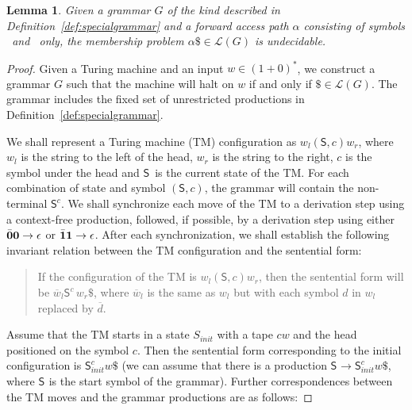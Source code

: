 \documentclass[9pt,nonatbib]{sigplanconf}
\newtheorem{lemma}[theorem]{Lemma}
\begin{document}
\newcommand{\state}{\ensuremath{\mathsf{S}}}
\newcommand{\nont}[2]{\ensuremath{\mathsf{S}_{#1}^{#2}}}
\begin{lemma}\label{lemma:grammar-undecidable}
Given a grammar    $G$    of   the    kind    described    in
Definition~\ref{def:specialgrammar}  and a forward access path $\alpha$
consisting  of symbols \acar\  and \acdr\  only, the membership problem
$\alpha\$ \in \mathscr{L}(G)$ is undecidable.
\end{lemma} 

\begin{proof}
Given a Turing machine and  an input $w\in (1+0)^*$, we
construct a grammar $G$ such that the machine will halt
on    $w$    if    and   only    if    $\$    \in
\mathscr{L}(G)$. The grammar includes  the fixed set of
unrestricted               productions               in
Definition~\ref{def:specialgrammar}.

We shall represent a Turing machine (TM) configuration 
as $w_l(\state,c)w_r$, where $w_l$ is the string to the
left of the head, $w_r$ is the string to the right, $c$
is the symbol under the head and \state\ is the current
state of  the TM.   For each combination  of state
and symbol  $(\state,c)$, the grammar will  contain the
non-terminal \nont{}{c}. We shall synchronize each move
of the TM to  a derivation  step using  a context-free production, followed, if possible, by a derivation
step using either  $\bar{\mathbf{0}}\mathbf{0} \rightarrow \epsilon$ or
$\bar{\mathbf{1}}\mathbf{1}   \rightarrow    \epsilon$.    After   each
synchronization,  we  shall   establish  the  following
invariant  relation between  the TM  configuration
and the sentential form:

\begin{quote}
  If    the   configuration    of   the    TM   is
  $w_l(\state,c)w_r$, then the  sentential form will be
  $\overline{w}_l\nont{}{c}\,w_r\$ $,                where
  $\overline{w}_l$ is  the same as $w_l$  but with each
  symbol $d$ in $w_l$ replaced by $\overline{d}$.
\end{quote}

Assume that  the TM starts  in a  state $S_\mathit{init}$ with  a tape
$cw$ and  the head positioned on  the symbol $c$. Then  the sentential
form    corresponding     to    the    initial     configuration    is
$\nont{\mathit{init}}{c}w\$$ (we  can assume that there  is a production
$\nont{}{} \rightarrow  \nont{\mathit{init}}{c}w\$$, where  \nont{}{} is
the start symbol of the  grammar). Further correspondences between the
TM moves and the grammar productions are as follows:


\end{proof}
\end{document}
